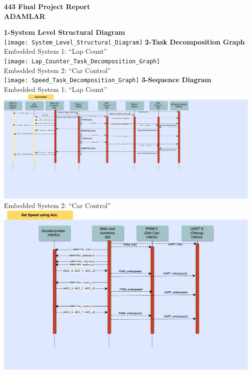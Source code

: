 \documentclass{article}
\begin{document}
\begin{center}
{\huge\textbf {443 Final Project Report}}\\[1in]
{\huge\textbf {ADAMLAR}}\\
\end{center}
\clearpage

{\huge\textbf {1-System Level Structural Diagram}}
\\
\texttt{[image: System\_Level\_Structural\_Diagram]}
\pagebreak
{\huge\textbf {2-Task Decomposition Graph}}
\\
{\huge {Embedded System 1: “Lap Count”}}
\\
\texttt{[image: Lap\_Counter\_Task\_Decomposition\_Graph]}
\\[0.2in]
{\huge {Embedded System 2: “Car Control”}}
\\[0.2in]
\texttt{[image: Speed\_Task\_Decomposition\_Graph]}
\clearpage
{\huge\textbf {3-Sequence Diagram}}
\\
{\huge {Embedded System 1: “Lap Count”}}
\\
\includegraphics[scale=0.3]{Lap_Counter_Seq_Diagram}
\\
{\huge {Embedded System 2: “Car Control”}}
\\
\includegraphics[scale=0.5]{Read_Acc_Control_Speed}
\end{document}
